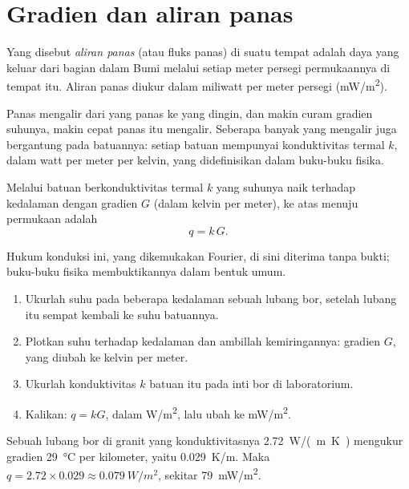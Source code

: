 \section{Gradien dan aliran panas}

\begin{definition}\label{def:g12:internal-heat:heat-flow}
Yang disebut \emph{aliran panas} (atau fluks panas) di suatu
tempat adalah daya yang keluar dari bagian dalam Bumi melalui setiap meter
persegi permukaannya di tempat itu. Aliran panas diukur dalam miliwatt per
meter persegi (\unit{mW/m^2}).
\end{definition}

Panas mengalir dari yang panas ke yang dingin, dan makin curam gradien suhunya,
makin cepat panas itu mengalir. Seberapa banyak yang mengalir juga bergantung
pada batuannya: setiap batuan mempunyai konduktivitas termal $k$, dalam watt
per meter per kelvin, yang didefinisikan dalam buku-buku fisika.

\begin{proposition}\label{prop:g12:internal-heat:fourier}
Melalui batuan berkonduktivitas termal $k$ yang suhunya naik terhadap
kedalaman dengan gradien $G$ (dalam kelvin per meter),  ke atas
menuju permukaan adalah
\[
  q = k\,G .
\]
\end{proposition}

Hukum konduksi ini, yang dikemukakan Fourier, di sini diterima tanpa bukti;
buku-buku fisika membuktikannya dalam bentuk umum.

\begin{method}\label{met:g12:internal-heat:borehole}
\begin{enumerate}
  \item Ukurlah suhu pada beberapa kedalaman sebuah lubang bor, setelah lubang
        itu sempat kembali ke suhu batuannya.
  \item Plotkan suhu terhadap kedalaman dan ambillah kemiringannya: gradien
        $G$, yang diubah ke kelvin per meter.
  \item Ukurlah konduktivitas $k$ batuan itu pada inti bor di laboratorium.
  \item Kalikan: $q = kG$, dalam \unit{W/m^2}, lalu ubah ke \unit{mW/m^2}.
\end{enumerate}
\end{method}

\begin{example}\label{ex:g12:internal-heat:borehole}
Sebuah lubang bor di granit yang konduktivitasnya \qty{2.72}{W/(m.K)}
mengukur gradien \qty{29}{\celsius} per kilometer, yaitu \qty{0.029}{K/m}.
Maka $q = 2.72 \times 0.029 \approx \qty{0.079}{W/m^2}$, sekitar
\qty{79}{mW/m^2}.
\end{example}

